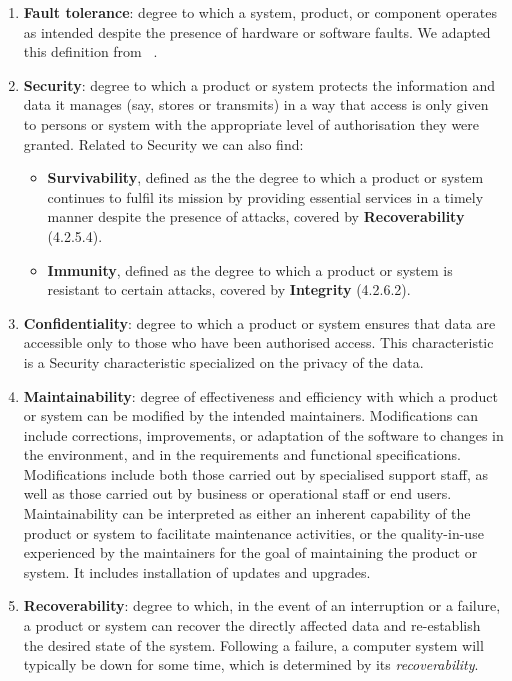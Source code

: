 \begin{enumerate}
    \item \textbf{Fault tolerance}: degree to which a system, product, or component operates as intended despite the presence of hardware or software faults. We adapted this definition from ~\cite{iso_central_secretary_isoiecieee_2010}.

    \item \textbf{Security}: degree to which a product or system protects the information and data it manages (say, stores or transmits) in a way that access is only given to persons or system with the appropriate level of authorisation they were granted.
    Related to Security we can also find:
    \begin{itemize}
        \item \textbf{Survivability}, defined as the the degree to which a product or system continues to fulfil its mission by providing essential services in a timely manner despite the presence of attacks, covered by \textbf{Recoverability} (4.2.5.4).
        \item \textbf{Immunity}, defined as the degree to which a product or system is resistant to certain attacks, covered by \textbf{Integrity} (4.2.6.2).
    \end{itemize}

    \item \textbf{Confidentiality}: degree to which a product or system ensures that data are accessible only to those who have been authorised access. This characteristic is a Security characteristic specialized on the privacy of the data.

    \item \textbf{Maintainability}: degree of effectiveness and efficiency with which a product or system can be modified by the intended maintainers. Modifications can include corrections, improvements, or adaptation of the software to changes in the environment, and in the requirements and functional specifications. Modifications include both those carried out by specialised support staff, as well as those carried out by business or operational staff or end users. Maintainability can be interpreted as either an inherent capability of the product or system to facilitate maintenance activities, or the quality-in-use experienced by the maintainers for the goal of maintaining the product or system. It includes installation of updates and upgrades. 

    \item \textbf{Recoverability}: degree to which, in the event of an interruption or a failure, a product or system can recover the directly affected data and re-establish the desired state of the system. Following a failure, a computer system will typically be down for some time, which is determined by its \textit{recoverability}.


\end{enumerate}
